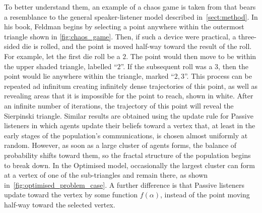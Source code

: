 To better understand them, an example of a chaos game is taken from \cite{Feldman.DavidP2012ChaosIntroduction} that bears a resemblance to the general speaker-listener model described in~\cref{sect:method}. In his book, Feldman begins by selecting a point anywhere within the outermost triangle shown in \cref{fig:chaos_game}. Then, if such a device were practical, a three-sided die is rolled, and the point is moved half-way toward the result of the roll. For example, let the first die roll be a $2$. The point would then move to be within the upper shaded triangle, labelled ``$2$''. If the subsequent roll was a $3$, then the point would lie anywhere within the triangle, marked ``$2,3$''. This process can be repeated ad infinitum creating infinitely dense trajectories of this point, as well as revealing areas that it is impossible for the point to reach, shown in white. After an infinite number of iterations, the trajectory of this point will reveal the Sierpinski triangle. Similar results are obtained using the update rule for Passive listeners in which agents update their beliefs toward a vertex that, at least in the early stages of the population's communications, is chosen almost uniformly at random. However, as soon as a large cluster of agents forms, the balance of probability shifts toward them, so the fractal structure of the population begins to break down. In the Optimised model, occasionally the largest cluster can form at a vertex of one of the sub-triangles and remain there, as shown in~\cref{fig:optimised_problem_case}. A further difference is that Passive listeners update toward the vertex by some function $f(\alpha)$, instead of the point moving half-way toward the selected vertex.  

